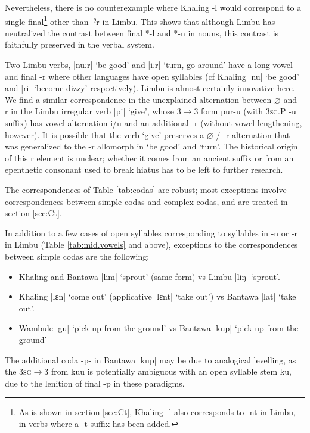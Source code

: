 \documentclass[oneside,a4paper,11pt]{article}
\newcommand{\ipa}[1]{{\phon\mbox{#1}}} %
\newcommand{\dhatu}[2]{|\ipa{#1}| `#2'}
\newcommand{\dhat}[1]{|\ipa{#1}|}
\begin{document}
Nevertheless, there is no counterexample where Khaling \ipa{-l} would correspond to a single final\footnote{As is shown in section \ref{sec:Ct}, Khaling \ipa{-l} also corresponds to \ipa{-nt} in Limbu, in verbs where a \ipa{-t} suffix has been added.} other than \ipa{-ˀr} in Limbu. This shows that although Limbu has neutralized the contrast between final *\ipa{-l} and  *\ipa{-n} in nouns, this contrast is faithfully preserved in the verbal system.


Two Limbu verbs, \dhatu{nuːr}{be good} and \dhatu{iːr}{turn, go around} have a long vowel and final \ipa{-r} where other languages have open syllables (cf Khaling \dhatu{nu}{be good} and \dhatu{ri}{become dizzy} respectively). Limbu is almost certainly innovative here. We find a similar correspondence in the unexplained alternation between $\varnothing$ and \ipa{-r} in the Limbu irregular verb \dhatu{pi}{give}, whose 3$\rightarrow$3 form \ipa{pur-u} (with \textsc{3sg.P} \ipa{-u} suffix) has vowel alternation \ipa{i/u} and an additional \ipa{-r} (without vowel lengthening, however). It is possible that the verb `give' preserves a $\varnothing$ / \ipa{-r} alternation that was generalized to the \ipa{-r} allomorph in `be good' and `turn'. The historical origin of this \ipa{r} element is unclear; whether it comes from an ancient suffix or from an epenthetic consonant used to break hiatus has to be left to further research.


The correspondences of Table \ref{tab:codas} are robust; most exceptions involve correspondences between simple codas and complex codas, and are treated in section \ref{sec:Ct}. 

In addition to a few cases of open syllables corresponding to syllables in \ipa{-n} or \ipa{-r} in Limbu (Table \ref{tab:mid.vowels} and above), exceptions to the correspondences between simple codas are the following:

\begin{itemize}
\item Khaling and Bantawa \dhatu{lim}{sprout}	 (same form) vs Limbu	\dhatu{liŋ}{sprout}.
\item Khaling \dhatu{lɛn}{come out} (applicative 	\dhatu{lɛnt}{take out}) vs Bantawa  \dhatu{lat}{take out}.
\item Wambule \dhatu{gu}{pick up from the ground} vs Bantawa \dhatu{kup}{pick up from the ground}
\end{itemize}

The additional coda \ipa{-p-} in Bantawa \dhat{kup} may be due to analogical levelling, as the \textsc{3sg}$\rightarrow$3 from \ipa{kuu} is potentially ambiguous with an open syllable stem \ipa{ku}, due to the lenition of final \ipa{-p} in these paradigms.
\end{document}
